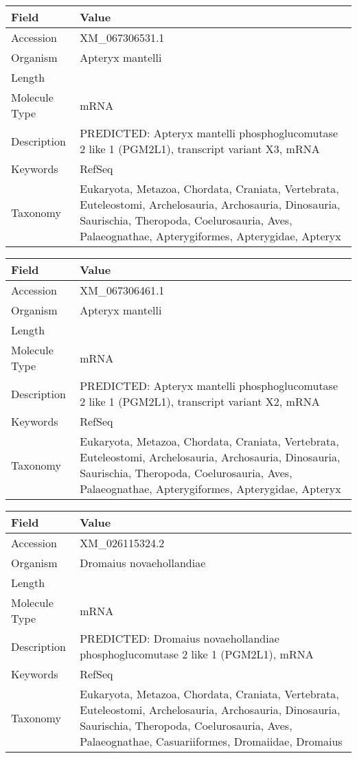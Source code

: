 \documentclass[10pt]{article}
\begin{document}
\vspace{1em}
{\footnotesize
\begin{longtable}{>{\raggedright\arraybackslash}p{4.5cm} >{\raggedright\arraybackslash}p{11.5cm}}
\textbf{Field} & \textbf{Value} \\
\hline
Accession & XM\_067306531.1 \\
Organism & Apteryx mantelli \\
Length & 6203 \\
Molecule Type & mRNA \\
Description & PREDICTED: Apteryx mantelli phosphoglucomutase 2 like 1 (PGM2L1), transcript variant X3, mRNA \\
Keywords & RefSeq \\
Taxonomy & Eukaryota, Metazoa, Chordata, Craniata, Vertebrata, Euteleostomi, Archelosauria, Archosauria, Dinosauria, Saurischia, Theropoda, Coelurosauria, Aves, Palaeognathae, Apterygiformes, Apterygidae, Apteryx \\
\end{longtable}
}

\vspace{1em}
{\footnotesize
\begin{longtable}{>{\raggedright\arraybackslash}p{4.5cm} >{\raggedright\arraybackslash}p{11.5cm}}
\textbf{Field} & \textbf{Value} \\
\hline
Accession & XM\_067306461.1 \\
Organism & Apteryx mantelli \\
Length & 6278 \\
Molecule Type & mRNA \\
Description & PREDICTED: Apteryx mantelli phosphoglucomutase 2 like 1 (PGM2L1), transcript variant X2, mRNA \\
Keywords & RefSeq \\
Taxonomy & Eukaryota, Metazoa, Chordata, Craniata, Vertebrata, Euteleostomi, Archelosauria, Archosauria, Dinosauria, Saurischia, Theropoda, Coelurosauria, Aves, Palaeognathae, Apterygiformes, Apterygidae, Apteryx \\
\end{longtable}
}

\vspace{1em}
{\footnotesize
\begin{longtable}{>{\raggedright\arraybackslash}p{4.5cm} >{\raggedright\arraybackslash}p{11.5cm}}
\textbf{Field} & \textbf{Value} \\
\hline
Accession & XM\_026115324.2 \\
Organism & Dromaius novaehollandiae \\
Length & 6620 \\
Molecule Type & mRNA \\
Description & PREDICTED: Dromaius novaehollandiae phosphoglucomutase 2 like 1 (PGM2L1), mRNA \\
Keywords & RefSeq \\
Taxonomy & Eukaryota, Metazoa, Chordata, Craniata, Vertebrata, Euteleostomi, Archelosauria, Archosauria, Dinosauria, Saurischia, Theropoda, Coelurosauria, Aves, Palaeognathae, Casuariiformes, Dromaiidae, Dromaius \\
\end{longtable}
}
\end{document}
